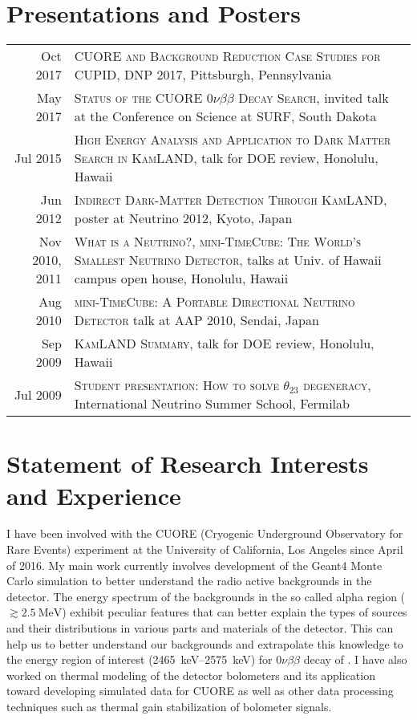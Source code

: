 \documentclass[a4paper,10pt]{article} %
\begin{document}
\section{Presentations and Posters}
\begin{tabular}{rp{11cm}}
	Oct 2017 & \textsc{CUORE and Background Reduction Case Studies for CUPID},
	DNP 2017, Pittsburgh, Pennsylvania \\
	May 2017 & \textsc{Status of the CUORE $0\nu\beta\beta$ Decay Search},
	invited talk at the Conference on Science at SURF, South Dakota \\
	Jul 2015 & \textsc{High Energy Analysis and Application to Dark Matter
	Search in KamLAND}, talk for DOE review, Honolulu, Hawaii \\
	Jun 2012 & \textsc{Indirect Dark-Matter Detection Through KamLAND}, poster
	at Neutrino 2012, Kyoto, Japan \\
	Nov 2010, 2011 & \textsc{What is a Neutrino?}, \textsc{mini-TimeCube: The
	World's Smallest Neutrino Detector}, talks at Univ. of Hawaii campus open
	house, Honolulu, Hawaii \\
	Aug 2010 & \textsc{mini-TimeCube: A Portable Directional Neutrino Detector}
	talk at AAP 2010, Sendai, Japan \\
	Sep 2009 & \textsc{KamLAND Summary}, talk for DOE review, Honolulu,
	Hawaii \\
	Jul 2009 & \textsc{Student presentation: How to solve $\theta_{23}$
	degeneracy}, International Neutrino Summer School, Fermilab \\
	
\end{tabular}


\section{Statement of Research Interests and Experience}

I have been involved with the CUORE (Cryogenic Underground Observatory for Rare
Events) experiment at the University of California, Los Angeles since April of
2016. My main work currently involves development of the Geant4 Monte Carlo
simulation to better understand the radio active backgrounds in the detector.
The energy spectrum of the backgrounds in the so called alpha region ($\gtrsim
\SI{2.5}{\mega\electronvolt}$) exhibit peculiar features that can better
explain the types of sources and their distributions in various parts and
materials of the detector. This can help us to better understand our
backgrounds and extrapolate this knowledge to the energy region of interest
(\SIrange{2465}{2575}{\kilo\electronvolt}) for $0\nu\beta\beta$ decay of
. I have also worked on thermal modeling of the detector
bolometers and its application toward developing simulated data for CUORE as
well as other data processing techniques such as thermal gain stabilization of
bolometer signals.
\end{document}
